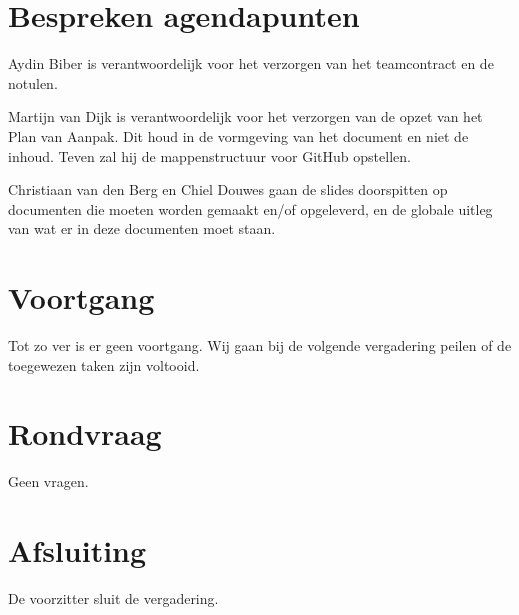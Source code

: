 \documentclass[dutch]{hu}
\begin{document}
\section{Bespreken agendapunten}
Aydin Biber is verantwoordelijk voor het verzorgen van het teamcontract en de notulen.

Martijn van Dijk is verantwoordelijk voor het verzorgen van de opzet van het Plan van Aanpak. Dit houd in de vormgeving van het document en niet de inhoud. Teven zal hij de mappenstructuur voor GitHub opstellen.

Christiaan van den Berg en Chiel Douwes gaan de slides doorspitten op documenten die moeten worden gemaakt en/of opgeleverd, en de globale uitleg van wat er in deze documenten moet staan.

\section{Voortgang}
Tot zo ver is er geen voortgang. Wij gaan bij de volgende vergadering peilen of de toegewezen taken zijn voltooid. 

\section{Rondvraag}
Geen vragen.

\section{Afsluiting}
De voorzitter sluit de vergadering.
\end{document}
